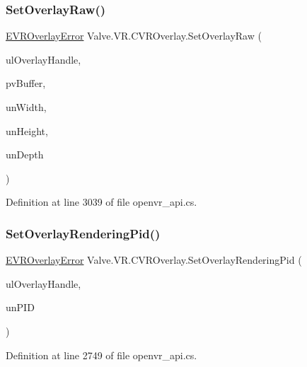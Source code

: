 \mbox{\label{class_valve_1_1_v_r_1_1_c_v_r_overlay_a2533abfa33181aa51663a91f73d16a6f}} 
\subsubsection{\texorpdfstring{SetOverlayRaw()}{SetOverlayRaw()}}
{\footnotesize\ttfamily \mbox{\hyperlink{namespace_valve_1_1_v_r_aaee5c5144f42b7969d45b854f51b0c18}{E\+V\+R\+Overlay\+Error}} Valve.\+V\+R.\+C\+V\+R\+Overlay.\+Set\+Overlay\+Raw (\begin{DoxyParamCaption}\item[{ulong}]{ul\+Overlay\+Handle,  }\item[{Int\+Ptr}]{pv\+Buffer,  }\item[{uint}]{un\+Width,  }\item[{uint}]{un\+Height,  }\item[{uint}]{un\+Depth }\end{DoxyParamCaption})}



Definition at line 3039 of file openvr\+\_\+api.\+cs.

\mbox{\label{class_valve_1_1_v_r_1_1_c_v_r_overlay_a7f2d7727b2865cec887468397e65c07b}} 
\subsubsection{\texorpdfstring{SetOverlayRenderingPid()}{SetOverlayRenderingPid()}}
{\footnotesize\ttfamily \mbox{\hyperlink{namespace_valve_1_1_v_r_aaee5c5144f42b7969d45b854f51b0c18}{E\+V\+R\+Overlay\+Error}} Valve.\+V\+R.\+C\+V\+R\+Overlay.\+Set\+Overlay\+Rendering\+Pid (\begin{DoxyParamCaption}\item[{ulong}]{ul\+Overlay\+Handle,  }\item[{uint}]{un\+P\+ID }\end{DoxyParamCaption})}



Definition at line 2749 of file openvr\+\_\+api.\+cs.

